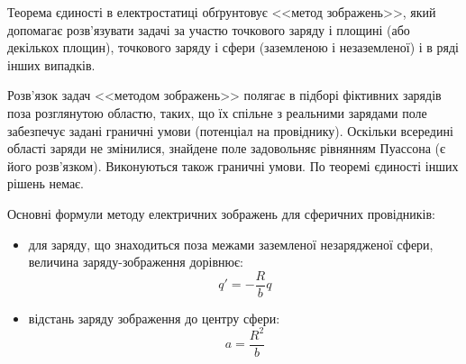 \begin{Theory}\small

Теорема єдиності в електростатиці обґрунтовує <<метод зображень>>, який допомагає розв'язувати задачі за участю точкового заряду і площині (або декількох площин), точкового заряду і сфери (заземленою і незаземленої) і в ряді інших випадків. 
 
Розв'язок задач <<методом зображень>> полягає в підборі фіктивних зарядів поза розглянутою областю, таких, що їх спільне з реальними зарядами поле забезпечує задані граничні умови (потенціал на провіднику). Оскільки всередині області заряди не змінилися, знайдене поле задовольняє рівнянням Пуассона (є його розв'язком). Виконуються також граничні умови. По теоремі єдиності інших рішень немає.


Основні формули методу електричних зображень для сферичних провідників:

\begin{itemize}
	\item для заряду, що знаходиться поза межами заземленої незарядженої сфери, величина заряду-зображення дорівнює:
	\begin{equation}\label{mirror_q_outside}
		q' = -\frac{R}{b}q
	\end{equation}
	
	\item відстань заряду зображення до центру сфери:
	\begin{equation}\label{mirror_q_outside}
	a = \frac{R^2}{b}
	\end{equation}	
\end{itemize}


\end{Theory}
